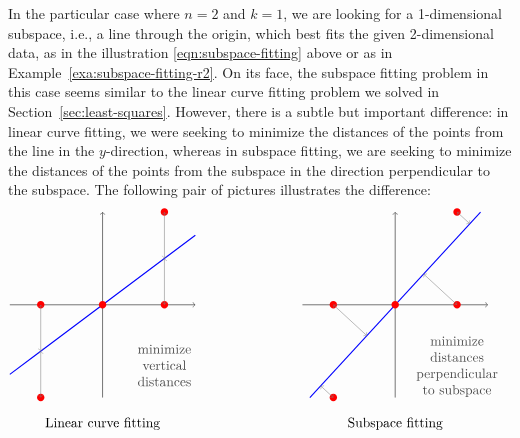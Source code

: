 In the particular case where $n=2$ and $k=1$, we are looking for a
1-dimensional subspace, i.e., a line through the origin, which best
fits the given 2-dimensional data, as in the illustration
{\eqref{eqn:subspace-fitting}} above or as in
Example~\ref{exa:subspace-fitting-r2}. On its face, the subspace
fitting problem in this case seems similar to the linear curve
fitting%
 problem we solved in
Section~\ref{sec:least-squares}. However, there is a subtle but
important difference: in linear curve fitting, we were seeking to
minimize the distances of the points from the line in the
$y$-direction, whereas in subspace fitting, we are seeking to minimize
the distances of the points from the subspace in the direction
perpendicular to the subspace. The following pair of pictures
illustrates the difference:
\begin{equation*}
  \begin{tikzpicture}[scale=0.8]
    \draw[thin,->] (-3,0) -- (3,0);
    \draw[thin,->] (0,-3) -- (0,3);
    \draw[thick,blue] (-3,-3*0.75) -- (3,3*0.75);
    \fill[color=red] (0,0) circle (0.12);
    \fill[color=red] (2,0) circle (0.12);
    \fill[color=red] (2,3) circle (0.12);
    \fill[color=red] (-2,0) circle (0.12);
    \fill[color=red] (-2,-3) circle (0.12);
    \draw[<->,black!50] (2,0) -- (2,1.5);
    \draw[<->,black!50] (2,3) -- (2,1.5);
    \draw[<->,black!50] (-2,0) -- (-2,-1.5);
    \draw[<->,black!50] (-2,-3) -- (-2,-1.5);
    \path (0,-3.5) node[below] {Linear curve fitting};
    \path[black!70] (2,-2) node {\begin{tabular}{c}minimize\\vertical\\distances\end{tabular}};
  \end{tikzpicture}
  \hspace{1in}
  \begin{tikzpicture}[scale=0.8]
    \draw[thin,->] (-3,0) -- (3,0);
    \draw[thin,->] (0,-3) -- (0,3);
    \draw[thick,blue] (-3*0.92,-3) -- (3*0.92, 3);
    \fill[color=red] (0,0) circle (0.12);
    \fill[color=red] (2,0) circle (0.12);
    \fill[color=red] (2,3) circle (0.12);
    \fill[color=red] (-2,0) circle (0.12);
    \fill[color=red] (-2,-3) circle (0.12);
    \draw[<->,black!50] (2,0) -- (0.997*0.92,0.997);
    \draw[<->,black!50] (2,3) -- (2.621*0.92,2.621);
    \draw[<->,black!50] (-2,0) -- (-0.997*0.92,-0.997);
    \draw[<->,black!50] (-2,-3) -- (-2.621*0.92,-2.621);
    \path (0,-3.5) node[below] {Subspace fitting};
    \path[black!70] (2,-2) node {\begin{tabular}{c}minimize\\distances\\perpendicular\\to subspace\end{tabular}};
  \end{tikzpicture}
\end{equation*}

